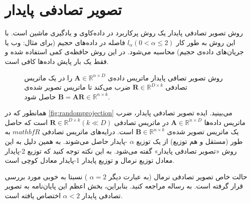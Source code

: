 \chapter{
تصویر تصادفی پایدار
}

روش تصویر تصادفی پایدار
\cite{litez116, litez166, litez19, litez99, litez96, litez104}
یک روش پرکاربرد در داده‌کاوی و یادگیری ماشین است. با این روش به طور کار 
$l_\alpha (0 < \alpha \leq 2)$
فاصله در داده‌های حجیم (برای مثال: وب یا جریان‌های داده‌ی حجیم) محاسبه می‌شود. در این روش حافظه‌ی کمی استفاده شده و فقط یک بار پایش داده‌ها کافی است. 

\begin{figure}[h]
\centering
\begin{latin}
\end{latin}
\caption{
روش تصویر تصافی پایدار ماتریس داده‌ی 
$\mathbf{A} \in \mathbb{R}^{n \times D}$
را در یک ماتریس تصادفی
$\mathbf{R} \in \mathbb{R}^{D \times k}$
ضرب می‌کند تا ماتریس تصویر شده‌ی 
$\mathbf{B} = \mathbf{AR} \in \mathbb{R}^{n \times k}$
حاصل شود.
}
\label{fig:randomprojection}
\end{figure}

همانطور که در 
\autoref{fig:randomprojection}
می‌بینید. ایده تصویر تصادفی پایدار، ضرب ماتریس داده‌ها
$\mathbf{A} \in \mathbb{R}^{n \times D}$
در ماتریس تصادفی 
$\mathbf{R} \in \mathbb{R}^{D \times k}  (k \ll D)$
است که حاصل یک ماتریس تصویر شده‌ی 
$\mathbf{B} \in \mathbb{R}^{n \times k}$
است. درایه‌های ماتریس تصادفی 
$mathbf{R}$
به طور 
(مستقل و هم توزیع)
از یک توزیع 
$\alpha$
-پایدار 
حاصل می‌شوند. به همین دلیل به این روش «تصویر تصادفی پایدار» گفته می‌شود. به این نکته توجه کنید که توزیع 2-پایدار معادل توزیع نرمال و توزیع پایدار 1-پایدار معادل کوچی
است.

حالت خاص تصویر تصادفی نرمال (به عبارت دیگر
$\alpha = 2$
) نسبتا به خوبی مورد بررسی قرار گرفته است. به رساله
\cite{litez166}
مراجعه کنید. بنابراین، بخش اعظم این پایان‌نامه به تصویر تصادفی پایدار 
$\alpha < 2$
اختصاص یافته است.


